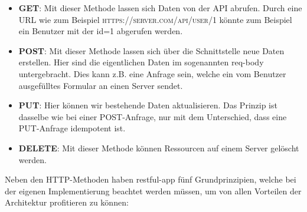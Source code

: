  \begin{itemize}
     \item \textbf{GET}: Mit dieser Methode lassen sich Daten von der API abrufen. Durch eine URL wie zum Beispiel \textsc{https://server.com/api/user/1} könnte zum Beispiel ein Benutzer mit der id=1 abgerufen werden.
     \item \textbf{POST}: Mit dieser Methode lassen sich über die Schnittstelle neue Daten erstellen. Hier sind die eigentlichen Daten im sogenannten \gls{req-body} untergebracht. Dies kann z.B. eine Anfrage sein, welche ein vom Benutzer ausgefülltes Formular an einen Server sendet.
     \item \textbf{PUT}: Hier können wir bestehende Daten aktualisieren. Das Prinzip ist dasselbe wie bei einer POST-Anfrage, nur mit dem Unterschied, dass eine PUT-Anfrage \gls{idempotent} ist.
     \item \textbf{DELETE}: Mit dieser Methode können Ressourcen auf einem Server gelöscht werden.
 \end{itemize}

Neben den HTTP-Methoden haben \gls{restful-app} fünf Grundprinzipien, welche bei der eigenen Implementierung beachtet werden müssen, um von allen Vorteilen der Architektur profitieren zu können:

